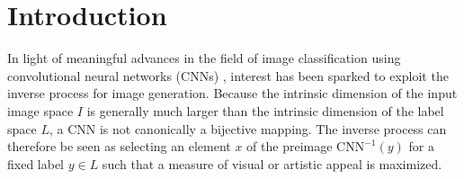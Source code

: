 
\section{Introduction}
\label{section:introduction}

In light of meaningful advances in the field of image classification using convolutional neural networks (CNNs) \cite{vgg2014}, interest has been sparked to exploit the inverse process for image generation. Because the intrinsic dimension of the input image space \(I\) is generally much larger than the intrinsic dimension of the label space \(L\), a CNN is not canonically a bijective mapping. The inverse process can therefore be seen as selecting an element \(x\) of the preimage \(\mathrm{CNN}^{-1}(y)\) for a fixed label \(y\in L\) such that a measure of visual or artistic appeal is maximized.


